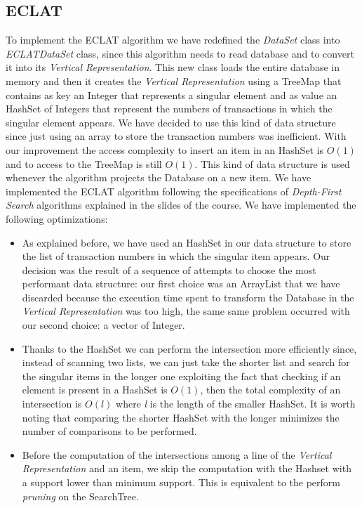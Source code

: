 \documentclass[11pt, a4paper]{article}
\begin{document}
		\subsection{ECLAT}
			To implement the ECLAT algorithm we have redefined the \textit{DataSet} class into \textit{ECLATDataSet} class, since this algorithm needs to read database and to convert it into its \textit{Vertical Representation}.
			This new class loads the entire database in memory and then it creates the \textit{Vertical Representation} using a TreeMap that contains as key an Integer that represents a singular element and as value an HashSet of Integers that represent the numbers of transactions in which the singular element appears.
			We have decided to use this kind of data structure since just using an array to store the transaction numbers was inefficient. With our improvement the access complexity to insert an item in an HashSet is $O(1)$ and to access to the TreeMap is still $O(1)$.\newline
			This kind of data structure is used whenever the algorithm projects the Database on a new item.
			We have implemented the ECLAT algorithm following the specifications of \textit{Depth-First Search} algorithms explained in the slides of the course.
			\newline \newline
			We have implemented the following optimizations:
			\begin{itemize}
				\item As explained before, we have used an HashSet in our data structure to store the list of transaction numbers in which the singular item appears. Our decision was the result of a sequence of attempts to choose the most performant data structure: our first choice was an ArrayList that we have discarded because the execution time spent to transform the Database in the \textit{Vertical Representation} was too high, the same same problem occurred with our second choice: a vector of Integer.
				\item Thanks to the HashSet we can perform the intersection more efficiently since, instead of scanning two lists, we can just take the shorter list and search for the singular items in the longer one exploiting the fact that checking if an element is present in a HashSet is $O(1)$, then the total complexity of an intersection is $O(l)$ where \textit{l} is the length of the smaller HashSet.
				It is worth noting that comparing the shorter HashSet with the longer minimizes the number of comparisons to be performed.
				\item Before the computation of the intersections among a line of the \textit{Vertical Representation} and an item, we skip the computation with the Hashset with a support lower than minimum support. This is equivalent to the perform \textit{pruning} on the SearchTree.
			
			\end{itemize}
			
\end{document}
